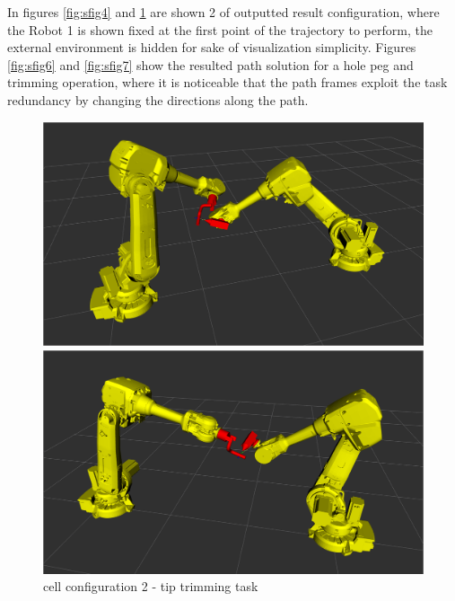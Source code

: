 \documentclass[twocolumn]{svjour3}
\begin{document}
In figures \ref{fig:sfig4} and \ref{fig:sfig5} are shown 2 of outputted result configuration, where the Robot 1 is shown fixed at the first point of the trajectory to perform, the external environment is hidden for sake of visualization simplicity.
Figures \ref{fig:sfig6} and \ref{fig:sfig7} show the resulted path solution for a hole peg and trimming operation, where it is noticeable that the path frames exploit the task redundancy by changing the directions along the path.
\begin{figure}[h]
		\includegraphics[width=0.9\linewidth]{pos1}
		\caption{cell configuration 1 - peg hole task}
		\label{fig:sfig4}
		\includegraphics[width=0.9\linewidth]{pos2}
		\caption{cell configuration 2 - tip trimming task}
		\label{fig:sfig5}
\end{figure}
\end{document}
